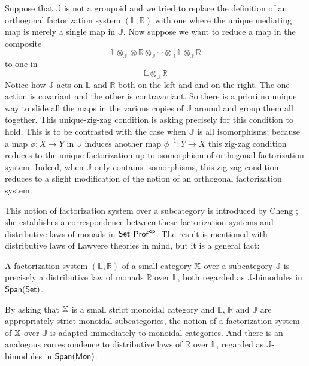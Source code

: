 Suppose that  $\mathbb J $ is not a groupoid and we tried to replace the definition of an orthogonal factorization system $(\mathbb L, \mathbb R)$ with one where the unique mediating map is merely a single map in $\mathbb J$.
Now suppose we want to reduce a map in the composite
$$\mathbb{L} \otimes_{\mathbb J} \otimes \mathbb{R} \otimes_{\mathbb J}  \cdots \otimes_{\mathbb J} \mathbb{L} \otimes_{\mathbb J} \mathbb R  $$
 to one in 
$$\mathbb{L} \otimes_{\mathbb J} \mathbb{R}$$
Notice how $\mathbb J$ acts on $\mathbb L$ and $\mathbb R$ both on the left and and on the right.  The one action is covariant and the other is contravariant.  So there is a priori no unique way to slide all the maps in the various copies of $\mathbb J$ around and group them all together.  This unique-zig-zag condition is asking precisely for this condition to hold.  This is to be contrasted with the case when $\mathbb J$ is all isomorphisms; because a map $\phi:X\to Y$ in $\mathbb J$ induces another map $\phi^{-1}:Y\to X$ this zig-zag condition reduces to the unique factorization up to isomorphism of  orthogonal factorization system.  Indeed, when $\mathbb J$ only contains isomorphisms, this zig-zag condition reduces to a slight modification of the notion of an orthogonal factorization system.


This notion of factorization system over a subcategory is introduced by Cheng \cite{lawvere}; she establishes a correspondence between these factorization systems and  distributive laws of monads in $\mathsf{Set}$-${\sf Prof}^{\mathsf{op}}$.   The result is mentioned with distributive laws of Lawvere theories in mind, but it is a general fact:
\begin{lemma}
\label{lem:zigzag}
A factorization system $(\mathbb{L},\mathbb{R})$ of a small  category $\mathbb{X}$ over a subcategory  $\mathbb J $ is precisely a distributive law of monads  $\mathbb{R}$ over $\mathbb{L}$, both regarded as $\mathbb{J}$-bimodules in $\mathsf{Span}(\mathsf{Set})$.
\end{lemma}
By asking that $\mathbb{X}$ is a small strict monoidal category and  $\mathbb{L}$, $\mathbb{R}$ and $\mathbb{J}$ are appropriately strict monoidal subcategories, the notion of a factorization system of $\mathbb{X}$ over $\mathbb J$ is adapted immediately to  monoidal categories. And there is an analogous correspondence  to distributive laws of $\mathbb{R}$ over $\mathbb{L}$, regarded as $\mathbb J$-bimodules in $\mathsf{Span}({\sf Mon})$.  



